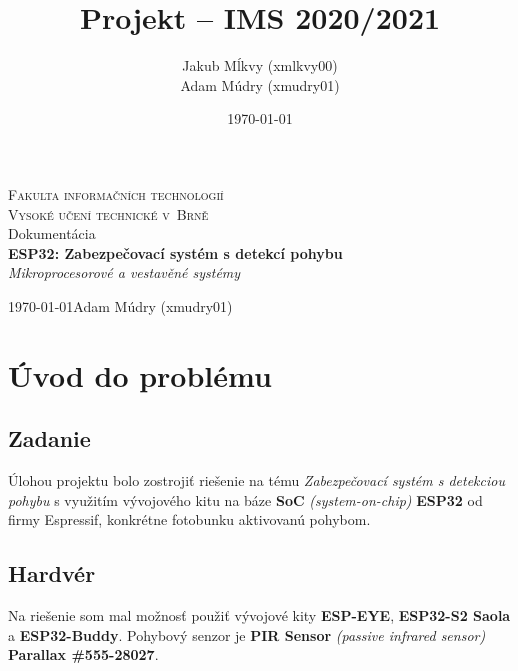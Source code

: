 \documentclass[a4paper,12pt]{article}
\author{Jakub Mĺkvy (xmlkvy00)\\Adam Múdry (xmudry01)}
\date{\today}
\title{\Large\bf Projekt -- IMS 2020/2021}
\begin{document}
\begin{titlepage}
	\begin{center}
	    \vspace*{+3cm}
		\Huge
		\textsc{Fakulta informačních technologií\\
		\huge Vysoké učení technické v~Brně}\\
	    {\LARGE{Dokumentácia\\
	    \vspace{4mm}
	    \Huge\textbf{{ESP32: Zabezpečovací systém s detekcí pohybu}}\\
		\vspace{4mm}
		\LARGE{\textit{Mikroprocesorové a vestavěné systémy}}
		}}
		 
	\end{center}
	{\Large \today \hfill Adam Múdry (xmudry01)}
	
	\thispagestyle{empty}
    \setcounter{page}{0}
\end{titlepage}

\newpage

\tableofcontents

\newpage
\section{Úvod do problému}
\subsection{Zadanie}

Úlohou projektu bolo zostrojiť riešenie na tému \textit{Zabezpečovací systém s detekciou pohybu} s využitím vývojového kitu na báze \textbf{SoC} \textit{(system-on-chip)} \textbf{ESP32} od firmy Espressif, konkrétne fotobunku aktivovanú pohybom.

\subsection{Hardvér}
Na riešenie som mal možnosť použiť vývojové kity \textbf{ESP-EYE}, \textbf{ESP32-S2 Saola} a \textbf{ESP32-Buddy}. Pohybový senzor je \textbf{PIR Sensor} \textit{(passive infrared sensor)} \textbf{Parallax \#555-28027}.
\end{document}
